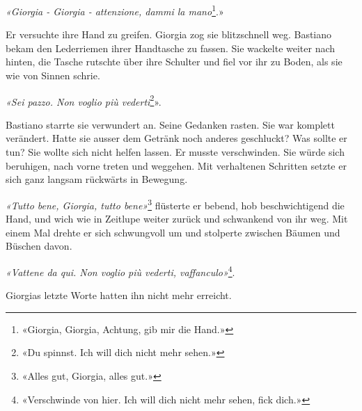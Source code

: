 \emph{«Giorgia - Giorgia - attenzione, dammi la mano}\footnote{«Giorgia, Giorgia, Achtung, gib mir die Hand.»}.»

Er versuchte ihre Hand zu greifen. Giorgia zog sie blitzschnell weg.
Bastiano bekam den Lederriemen ihrer Handtasche zu fassen. Sie wackelte
weiter nach hinten, die Tasche rutschte über ihre Schulter und fiel vor
ihr zu Boden, als sie wie von Sinnen schrie.

\emph{«Sei pazzo. Non voglio più vederti}\footnote{«Du spinnst. Ich will dich nicht mehr sehen.»}».

Bastiano starrte sie verwundert an. Seine Gedanken rasten. Sie war komplett
verändert. Hatte sie ausser dem Getränk noch anderes geschluckt? Was
sollte er tun? Sie wollte sich nicht helfen lassen. Er musste
verschwinden. Sie würde sich beruhigen, nach vorne treten und weggehen.
Mit verhaltenen Schritten setzte er sich ganz langsam rückwärts in
Bewegung.

\emph{«Tutto bene, Giorgia, tutto bene»}\footnote{«Alles gut, Giorgia, alles gut.»} flüsterte er bebend, hob
beschwichtigend die Hand, und wich wie in Zeitlupe weiter zurück und
schwankend von ihr weg. Mit einem Mal drehte er sich schwungvoll um und
stolperte zwischen Bäumen und Büschen davon.

\emph{«Vattene da qui. Non voglio più vederti, vaffanculo»}\footnote{«Verschwinde von hier. Ich will dich nicht mehr sehen, fick dich.»}.

Giorgias letzte Worte hatten ihn nicht mehr erreicht.
